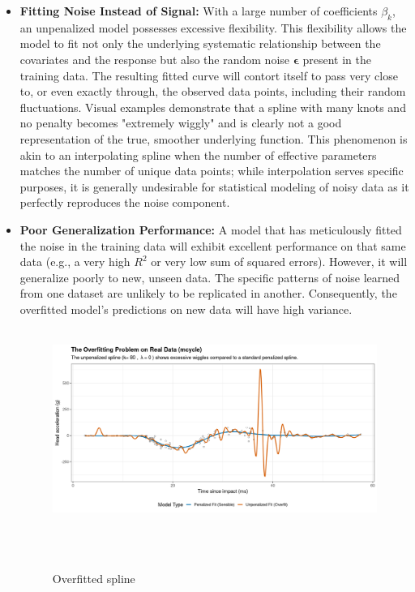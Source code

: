 \documentclass[11pt, a4paper]{article}
\begin{document}
\begin{itemize}
 \item \textbf{Fitting Noise Instead of Signal:} With a large number of coefficients $\beta_k$, an unpenalized model possesses excessive flexibility. This flexibility allows the model to fit not only the underlying systematic relationship between the covariates and the response but also the random noise $\boldsymbol{\epsilon}$ present in the training data. The resulting fitted curve will contort itself to pass very close to, or even exactly through, the observed data points, including their random fluctuations. Visual examples demonstrate that a spline with many knots and no penalty becomes "extremely wiggly" and is clearly not a good representation of the true, smoother underlying function. This phenomenon is akin to an interpolating spline when the number of effective parameters matches the number of unique data points; while interpolation serves specific purposes, it is generally undesirable for statistical modeling of noisy data as it perfectly reproduces the noise component.

 \item \textbf{Poor Generalization Performance:} A model that has meticulously fitted the noise in the training data will exhibit excellent performance on that same data (e.g., a very high $R^2$ or very low sum of squared errors). However, it will generalize poorly to new, unseen data. The specific patterns of noise learned from one dataset are unlikely to be replicated in another. Consequently, the overfitted model's predictions on new data will have high variance.

 \begin{figure}
  \centering
  \includegraphics[width=\linewidth]{overfit.png}
  \caption{Overfitted spline}
  \label{fig:enter-label}
 \end{figure}

\end{itemize}
\end{document}
